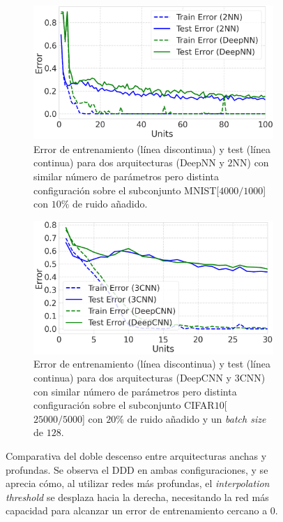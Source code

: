 \begin{figure}[htbp]
    \centering
    \begin{subfigure}[b]{0.47\textwidth}
        \centering
        \includegraphics[width=\textwidth]{img/experiments/2nnvsdeepnn.png}
        \caption{Error de entrenamiento (línea discontinua) y test (línea continua) para dos arquitecturas (DeepNN y $2$NN) con similar número de parámetros pero distinta configuración sobre el subconjunto MNIST[$4000/1000$] con $10\%$ de ruido añadido.}\label{fig:2nnvsdeepnn}
    \end{subfigure}
    \hfill 
    \begin{subfigure}[b]{0.47\textwidth} 
        \centering
        \includegraphics[width=\textwidth]{img/experiments/3cnnvsdeepcnn.png}
        \caption{Error de entrenamiento (línea discontinua) y test (línea continua) para dos arquitecturas (DeepCNN y $3$CNN) con similar número de parámetros pero distinta configuración sobre el subconjunto CIFAR$10$[$25000/5000$] con $20\%$ de ruido añadido y un \textit{batch size} de $128$.}\label{fig:3cnnvsdeepcnn}
    \end{subfigure}
    
    \caption[Comparativa del doble descenso entre arquitecturas anchas y profundas.]{Comparativa del doble descenso entre arquitecturas anchas y profundas. Se observa el DDD en ambas configuraciones, y se aprecia cómo, al utilizar redes más profundas, el \textit{interpolation threshold} se desplaza hacia la derecha, necesitando la red más capacidad para alcanzar un error de entrenamiento cercano a $0$.}\label{fig:width-depth}
\end{figure}

